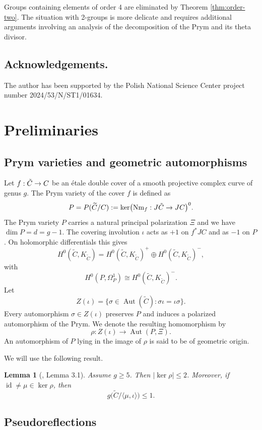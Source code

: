 \documentclass[10pt,a4paper]{amsart}
\newtheorem{lem}[thm]{Lemma}
\numberwithin{equation}{section}
\newcommand{\tC}{\Tilde{C}}
\DeclareMathOperator{\Aut}{Aut}
\begin{document}
Groups containing elements of order 4 are eliminated by Theorem \ref{thm:order-two}. The situation with 2-groups is more delicate and requires additional arguments involving an analysis of the decomposition of the Prym and its theta divisor. 

\subsection*{Acknowledgements.} 
The author has been supported by the Polish National Science Center project number 2024/53/N/ST1/01634.


\section{Preliminaries}\label{sec:prelim}

\subsection{Prym varieties and geometric automorphisms}

Let $f:\tC\to C$ be an \'{e}tale double cover of a smooth projective complex curve of genus $g$. The Prym variety of the cover $f$ is defined as $$P=P(\widetilde C/C):=\ker\bigl(\operatorname{Nm}_f: J\tC\to JC\bigr)^0.$$
The Prym variety \(P\) carries a natural principal polarization $\Xi$ and we have \(\dim P = d = g-1\). The covering involution $\iota$ acts as $+1$ on $f^*JC$ and as $-1$ on $P$. On holomorphic differentials this gives
$$H^0(\widetilde C,K_{\widetilde C})
=H^0(\widetilde C,K_{\widetilde C})^+
\oplus H^0(\widetilde C,K_{\widetilde C})^-,$$
with
$$ H^0(P,\Omega_P^1)\cong H^0(\widetilde C,K_{\widetilde C})^-.$$
Let $$Z(\iota)=\{\sigma\in\Aut(\widetilde C):\sigma\iota=\iota\sigma\}.$$
Every automorphism $\sigma\in Z(\iota)$ preserves $P$ and induces a polarized automorphism of the Prym. We denote the resulting homomorphism by
\[
\rho\colon Z(\iota)\longrightarrow \Aut(P,\Xi).
\]
An automorphism of $P$ lying in the image of $\rho$ is said to be of geometric origin.

We will use the following result.

\begin{lem}[\cite{ALN}, Lemma 3.1]\label{lem:kernel}
Assume $g\geq5$. Then $|\ker\rho|\leq2$. Moreover, if $\operatorname{id}\neq\mu\in\ker\rho$, then $$g\bigl(\widetilde C/\langle\mu,\iota\rangle\bigr)\leq1.$$
\end{lem}

\subsection{Pseudoreflections}
\end{document}
